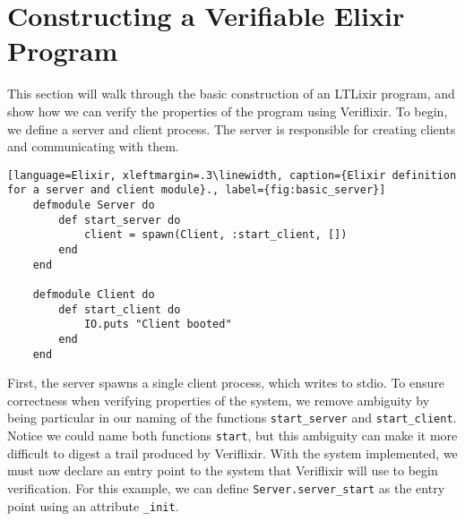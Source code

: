 \section{Constructing a Verifiable Elixir Program} \label{sec:verifiable}
This section will walk through the basic construction of an LTLixir program, and show how we can verify the properties of the program using Veriflixir. To begin, we define a server and client process. The server is responsible for creating clients and communicating with them. 
\begin{lstlisting}[language=Elixir, xleftmargin=.3\linewidth, caption={Elixir definition for a server and client module}., label={fig:basic_server}]
    defmodule Server do
        def start_server do
            client = spawn(Client, :start_client, [])
        end
    end

    defmodule Client do
        def start_client do
            IO.puts "Client booted"
        end
    end
\end{lstlisting}
First, the server spawns a single client process, which writes to stdio. To ensure correctness when verifying properties of the system, we remove ambiguity by being particular in our naming of the functions \texttt{start\_server} and \texttt{start\_client}. Notice we could name both functions \texttt{start}, but this ambiguity can make it more difficult to digest a trail produced by Veriflixir. With the system implemented, we must now declare an entry point to the system that Veriflixir will use to begin verification. For this example, we can define \texttt{Server.server\_start} as the entry point using an attribute \texttt{\@vae\_init}.

